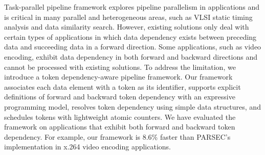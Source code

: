 Task-parallel pipeline framework explores pipeline parallelism in applications and is critical in many parallel and heterogeneous areas, such as VLSI static timing analysis and data similarity search. However, existing solutions only deal with certain types of applications in which data dependency exists between preceding data and succeeding data in a forward direction. Some applications, such as video encoding, exhibit data dependency in both forward and backward directions and cannot be processed with existing solutions. To address the limitation, we introduce a token dependency-aware pipeline framework. Our framework associates each data element with a token as its identifier, supports explicit definitions of forward and backward token dependency with an expressive programming model, resolves token dependency using simple data structures, and schedules tokens with lightweight atomic counters. We have evaluated the framework on applications that exhibit both forward and backward token dependency. For example, our framework is 8.6\% faster than PARSEC’s implementation in x.264 video encoding applications.
